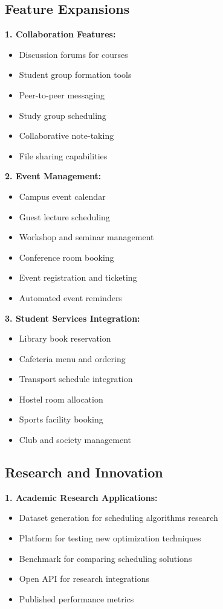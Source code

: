\subsection{Feature Expansions}

\textbf{1. Collaboration Features:}
\begin{itemize}
    \item Discussion forums for courses
    \item Student group formation tools
    \item Peer-to-peer messaging
    \item Study group scheduling
    \item Collaborative note-taking
    \item File sharing capabilities
\end{itemize}

\textbf{2. Event Management:}
\begin{itemize}
    \item Campus event calendar
    \item Guest lecture scheduling
    \item Workshop and seminar management
    \item Conference room booking
    \item Event registration and ticketing
    \item Automated event reminders
\end{itemize}

\textbf{3. Student Services Integration:}
\begin{itemize}
    \item Library book reservation
    \item Cafeteria menu and ordering
    \item Transport schedule integration
    \item Hostel room allocation
    \item Sports facility booking
    \item Club and society management
\end{itemize}

\subsection{Research and Innovation}

\textbf{1. Academic Research Applications:}
\begin{itemize}
    \item Dataset generation for scheduling algorithms research
    \item Platform for testing new optimization techniques
    \item Benchmark for comparing scheduling solutions
    \item Open API for research integrations
    \item Published performance metrics
\end{itemize}

